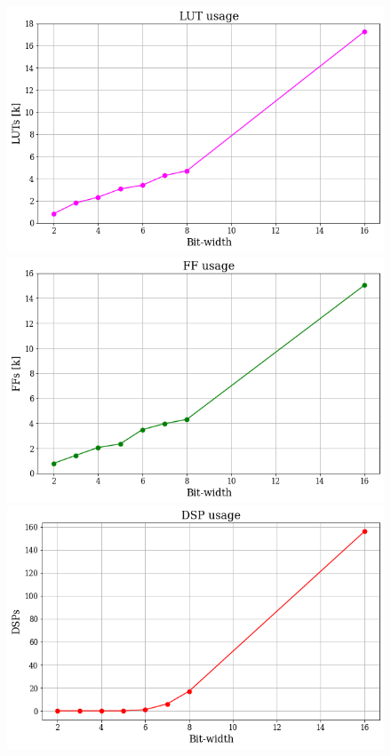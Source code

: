 \documentclass[../../main.tex]{subfiles}
\begin{document}
\begin{figure}[h] 
  \label{ fig7} 
  \begin{minipage}[b]{0.5\linewidth}
    \centering
    \includegraphics[width=.9\linewidth]{sections/05/Images/Quant_LUT_1ele.png} 
    \vspace{2ex}
  \end{minipage}%
  \begin{minipage}[b]{0.5\linewidth}
    \centering
    \includegraphics[width=.9\linewidth]{sections/05/Images/Quant_FF_1ele.png}
    \vspace{2ex}
  \end{minipage} 
  \begin{minipage}[b]{0.5\linewidth}
    \centering
    \includegraphics[width=.9\linewidth]{sections/05/Images/Quant_DSP_1ele.png} 

\end{minipage}
\end{figure}
\end{document}

